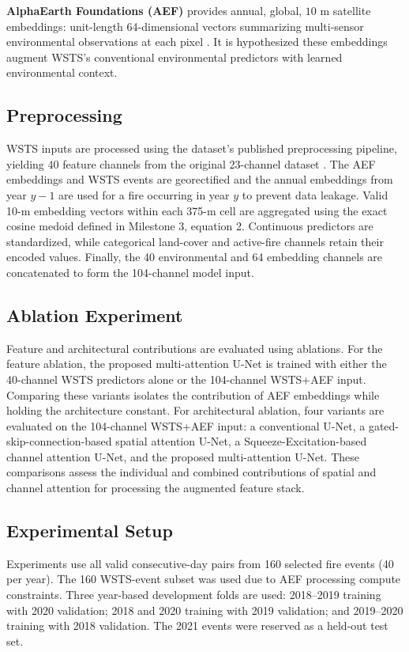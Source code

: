 \documentclass[sigconf]{acmart}
\begin{document}
\textbf{AlphaEarth Foundations (AEF)} provides annual, global, $10$ m
satellite embeddings: unit-length 64-dimensional vectors summarizing
multi-sensor environmental observations at each pixel \cite{brown}. It is hypothesized these embeddings augment
WSTS's conventional environmental predictors with learned environmental context.

\subsection{Preprocessing}
WSTS inputs are processed using the dataset's published preprocessing pipeline, yielding 40 feature channels from the 
original 23-channel dataset \cite{gerard2023wildfirespreadts}. The AEF embeddings and WSTS events are 
georectified and the annual embeddings from year $y - 1$ are used for a fire occurring in year $y$ to prevent data leakage.     
Valid 10-m embedding vectors within each 375-m cell are aggregated using the exact cosine medoid defined in
Milestone 3, equation 2. Continuous predictors are standardized, while categorical land-cover and active-fire channels retain 
their encoded values. Finally, the 40 environmental and 64 embedding channels are concatenated to form the 104-channel model 
input.

\subsection{Ablation Experiment}
Feature and architectural contributions are evaluated using ablations. For the feature ablation, the proposed 
multi-attention U-Net is trained with either the 40-channel WSTS predictors alone or the 104-channel WSTS+AEF input. 
Comparing these variants isolates the contribution of AEF embeddings while holding the architecture constant.
For architectural ablation, four variants are evaluated on the 104-channel WSTS+AEF input: a 
conventional U-Net, a gated-skip-connection-based spatial attention U-Net, a 
Squeeze-Excitation-based channel attention U-Net, and the proposed multi-attention U-Net. These comparisons 
assess the individual and combined contributions of spatial and channel attention for processing the augmented feature stack.

\subsection{Experimental Setup}
Experiments use all valid consecutive-day pairs from 160 selected fire events (40 per year). The 160 WSTS-event subset was used 
due to AEF processing compute constraints. Three year-based development folds are used: 2018--2019 training with 2020 validation; 
2018 and 2020 training with 2019 validation; and 2019--2020 training with 2018 validation. The 2021 events were reserved as a held-out 
test set.
\end{document}
